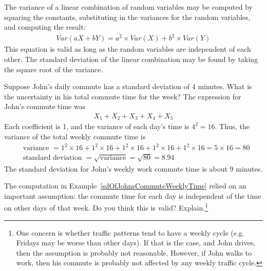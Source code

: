 \begin{termBox}{
The variance of a linear combination of random variables may be computed by squaring the constants, substituting in the variances for the random variables, and computing the result:
\begin{align*}
Var(aX + bY) = a^2\times Var(X) + b^2\times Var(Y)
\end{align*}
This equation is valid as long as the random variables are independent of each other. The standard deviation of the linear combination may be found by taking the square root of the variance.}
\end{termBox}

\begin{example}{Suppose John's daily commute has a standard deviation of 4 minutes. What is the uncertainty in his total commute time for the week?} \label{sdOfJohnsCommuteWeeklyTime}
The expression for John's commute time was
\begin{align*}
X_1 + X_2 + X_3 + X_4 + X_5
\end{align*}
Each coefficient is 1, and the variance of each day's time is $4^2=16$. Thus, the variance of the total weekly commute time is
\begin{align*}
&\text{variance }= 1^2 \times  16 + 1^2 \times  16 + 1^2 \times  16 + 1^2 \times  16 + 1^2 \times  16 = 5\times 16 = 80 \\
&\text{standard deviation } = \sqrt{\text{variance}} = \sqrt{80} = 8.94
\end{align*}
The standard deviation for John's weekly work commute time is about 9 minutes.
\end{example}

\begin{exercise}
The computation in Example~\ref{sdOfJohnsCommuteWeeklyTime} relied on an important assumption: the commute time for each day is independent of the time on other days of that week. Do you think this is valid? Explain.\footnote{One concern is whether traffic patterns tend to have a weekly cycle (e.g. Fridays may be worse than other days). If that is the case, and John drives, then the assumption is probably not reasonable. However, if John walks to work, then his commute is probably not affected by any weekly traffic cycle.}
\end{exercise}

